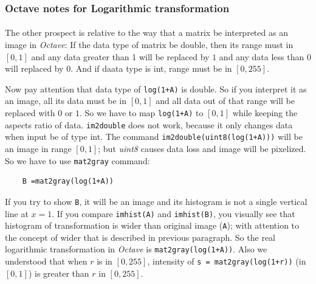 \subsubsection{Octave notes for Logarithmic transformation}
\label{Octave_notes_for_Logarithmic_transformation}

\paragraph{}The other prospect is relative to the way that a matrix be interpreted as an
image in \emph{Octave}: If the data type of matrix be double, then its range
must in $[0,1]$ and any data greater than 1 will be replaced by $1$ 
and any data less than $0$ will replaced by $0$. And if daata type is int,
range must be in $[0,255]$.

Now pay attention that data type of \texttt{log(1+A)} is double. So if you
interpret it as an image, all its data must be in $[0,1]$ and all data out
of that range will be replaced with $0$ or $1$. So we have to map
\texttt{log(1+A)} to $[0,1]$ while keeping the aspects ratio of data.
\texttt{im2double} does not work, because it only changes data when input be
of type int. The command \texttt{im2double(uint8(log(1+A)))} will be an
image in range $[0,1]$; but \emph{uint8} causes data loss and image will be
pixelized. So we have to use \texttt{mat2gray} command: 
\begin{Verbatim}
    B =mat2gray(log(1+A))
\end{Verbatim}
If you try to show \texttt{B}, it will be an image and its histogram is not a
single vertical line at $x = 1$. If you compare \texttt{imhist(A)} and
\texttt{imhist(B)}, you visually see that histogram of transformation is wider
than original image (\texttt{A}); with attention to the concept of wider that is
described in previous paragraph. So the real logarithmic transformation in
\emph{Octave} is \texttt{mat2gray(log(1+A))}.
Also we understood that when $r$ is in $[0,255]$, intensity of 
\texttt{s = mat2gray(log(1+r))} (in $[0,1]$) is greater than 
$r$ in $[0,255]$. 
